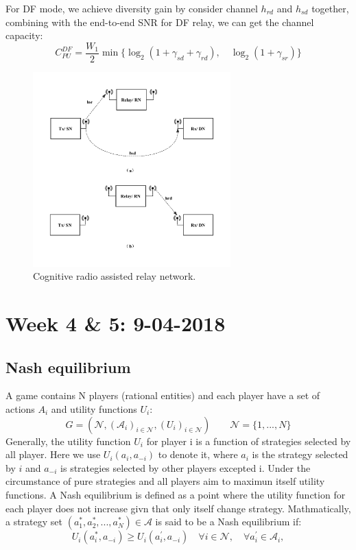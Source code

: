 \documentclass[journal]{IEEEtran}
\begin{document}
For DF mode, we achieve diversity gain by consider channel $h_{rd}$ and $h_{sd}$ together, combining with the end-to-end SNR for DF relay, we can get the channel capacity:
\begin{equation}
C_{PU}^{DF} = \frac{W_1}{2} \min\{\log_2(1 + \gamma_{sd}+\gamma_{rd}),\quad \log_2(1 + \gamma_{sr})\}
\end{equation}
\begin{figure}[H]
    \centering
    \includegraphics[width=3in]{relay.pdf}
    \caption{Cognitive radio assisted relay network.}

\end{figure}

\section{Week 4 \& 5: 9-04-2018}

\subsection{Nash equilibrium}
A game contains N players (rational entities) and each player have a set of actions $A_i$ and utility functions $U_i$:
\begin{equation}
  G = (\mathcal N, (\mathcal A_i)_{i \in \mathcal N},(U_i)_{i \in \mathcal N}) \qquad \mathcal N = \{1,...,N\}
\end{equation}
Generally, the utility function $U_i$ for player i is a function of strategies selected by all player. Here we use $U_i(a_i,a_{-i})$ to denote it, where $a_i$ is the strategy selected by $i$ and $a_{-i}$ is strategies selected by other players excepted i. Under the circumstance of pure strategies and all players aim to maximun itself utility functions. A Nash equilibrium is defined as a point where the utility function for each player does not increase givn that only itself change strategy. Mathmatically, a strategy set $(a_1^*,a_2^*,...,a_N^*) \in \mathcal A$ is said to be a Nash equilibrium if:
\begin{equation}
  U_i(a_i^*,a_{-i}) \geq U_i(a_i^\prime,a_{-i}) \quad \forall i \in \mathcal N, \quad \forall a_i^\prime \in \mathcal A_i,
\end{equation}
\end{document}
